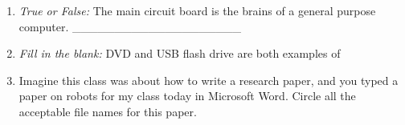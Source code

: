 \documentclass[11pt]{article}
\begin{document}
\begin{enumerate}
\item \emph{True or False:} The main circuit board is the brains of a general purpose computer. \_\_\_\_\_\_\_\_\_\_\_\_\_\_\_\_\_\_\_\_
\vspace{1.5mm}

\item \emph{Fill in the blank:} DVD and USB flash drive are both examples of 
\vspace{1.5mm}

\item Imagine this class was about how to write a research paper, and you typed a paper on robots for my class today in Microsoft Word.  Circle all the acceptable file names for this paper.

\vspace{1.5mm}

\end{enumerate}
\end{document}
